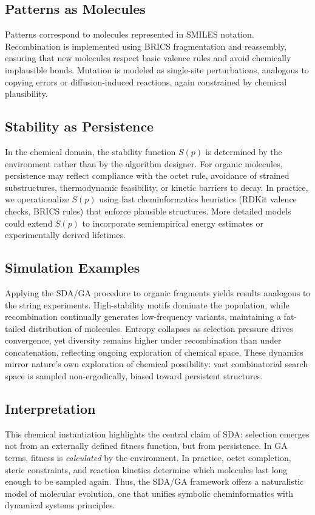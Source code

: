 \documentclass[life,article,submit,pdftex,moreauthors]{Definitions/mdpi}
\begin{document}
\subsection{Patterns as Molecules}
Patterns correspond to molecules represented in SMILES notation. Recombination is implemented 
using BRICS fragmentation and reassembly, ensuring that new molecules respect basic valence 
rules and avoid chemically implausible bonds. Mutation is modeled as single-site perturbations, 
analogous to copying errors or diffusion-induced reactions, again constrained by chemical 
plausibility.

\subsection{Stability as Persistence}
In the chemical domain, the stability function $S(p)$ is determined by the environment rather 
than by the algorithm designer. For organic molecules, persistence may reflect compliance with 
the octet rule, avoidance of strained substructures, thermodynamic feasibility, or kinetic 
barriers to decay. In practice, we operationalize $S(p)$ using fast cheminformatics heuristics 
(RDKit valence checks, BRICS rules) that enforce plausible structures. More detailed models 
could extend $S(p)$ to incorporate semiempirical energy estimates or experimentally derived 
lifetimes.

\subsection{Simulation Examples}
Applying the SDA/GA procedure to organic fragments yields results analogous to the string 
experiments. High-stability motifs dominate the population, while recombination continually 
generates low-frequency variants, maintaining a fat-tailed distribution of molecules. Entropy 
collapses as selection pressure drives convergence, yet diversity remains higher under 
recombination than under concatenation, reflecting ongoing exploration of chemical space. 
These dynamics mirror nature’s own exploration of chemical possibility: vast combinatorial 
search space is sampled non-ergodically, biased toward persistent structures.

\subsection{Interpretation}
This chemical instantiation highlights the central claim of SDA: selection emerges not from 
an externally defined fitness function, but from persistence. In GA terms, fitness is 
\emph{calculated} by the environment. In practice, octet completion, steric constraints, and 
reaction kinetics determine which molecules last long enough to be sampled again. Thus, the 
SDA/GA framework offers a naturalistic model of molecular evolution, one that unifies symbolic 
cheminformatics with dynamical systems principles.
\end{document}
